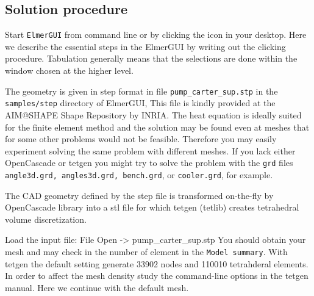 \subsection*{Solution procedure}

Start \texttt{ElmerGUI} from command line or by clicking the icon in your desktop. Here we describe 
the essential steps in the ElmerGUI by writing out the clicking procedure. Tabulation generally means that the 
selections are done within the window chosen at the higher level. 

The geometry is given in step format in file \texttt{pump\_carter\_sup.stp}
in the \texttt{samples/step} directory of ElmerGUI, 
This file is kindly provided at the AIM@SHAPE Shape Repository by INRIA.
The heat equation is ideally suited for the finite element method and 
the solution may be found even at meshes that for some other problems
would not be feasible. Therefore you may easily experiment solving the same
problem with different meshes. If you lack either OpenCascade or tetgen you might try to solve the problem 
with the \texttt{grd} files \texttt{angle3d.grd, angles3d.grd, 
bench.grd}, or \texttt{cooler.grd}, for example.

The CAD geometry defined by the step file is transformed on-the-fly by OpenCascade library into 
a stl file 
for which tetgen (tetlib) creates tetrahedral volume discretization.

Load the input file:
\ttbegin
File 
  Open -> pump_carter_sup.stp
\ttend
You should obtain your mesh and may check in the number of element in the \texttt{Model summary}. 
With tetgen the default setting generate 33902 nodes and 110010 tetrahderal elements.
In order to affect the mesh density study the command-line options in the tetgen manual.
Here we continue with the default mesh.


